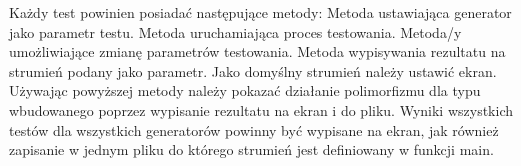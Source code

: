 Każdy test powinien posiadać następujące metody\+: Metoda ustawiająca generator jako parametr testu. Metoda uruchamiająca proces testowania. Metoda/y umożliwiające zmianę parametrów testowania. Metoda wypisywania rezultatu na strumień podany jako parametr. Jako domyślny strumień należy ustawić ekran. Używając powyższej metody należy pokazać działanie polimorfizmu dla typu wbudowanego poprzez wypisanie rezultatu na ekran i do pliku. Wyniki wszystkich testów dla wszystkich generatorów powinny być wypisane na ekran, jak również zapisanie w jednym pliku do którego strumień jest definiowany w funkcji main. 